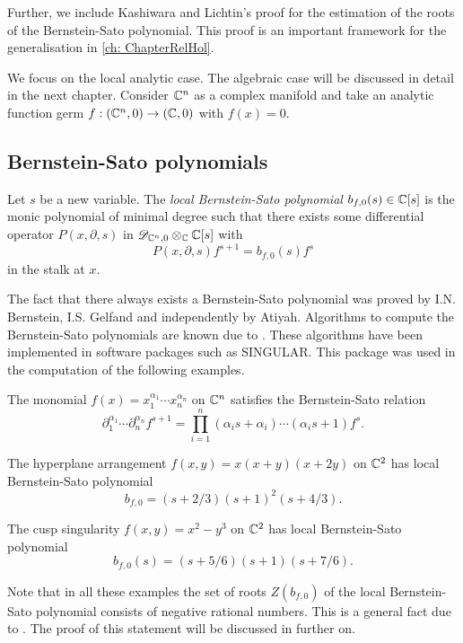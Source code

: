 Further, we include Kashiwara and Lichtin's proof for the estimation of the roots of the Bernstein-Sato polynomial.
This proof is an important framework for the generalisation in \cref{ch: ChapterRelHol}.

We focus on the local analytic case.
The algebraic case will be discussed in detail in the next chapter.
Consider $\mathbb{C}^n$ as a complex manifold and take an analytic function germ $f:(\mathbb{C}^n,0)\to (\mathbb{C},0)$ with  $f(x) = 0$.
\subsection{Bernstein-Sato polynomials}
\begin{definition}
  Let $s$ be a new variable.
  The {\it local Bernstein-Sato polynomial} $b_{f,0}(s)\in \mathbb{C}[s]$ is the monic polynomial of minimal degree such that there exists some differential operator $P(x,\partial,s)$ in $\mathscr{D}_{\mathbb{C}^n,0}\otimes_{\mathbb{C}}\mathbb{C}[s]$ with
  $$P(x,\partial,s) f^{s+1} = b_{f,0}(s) f^s$$
  in the stalk at $x$.
\end{definition}
The fact that there always exists a Bernstein-Sato polynomial was proved by I.N. Bernstein, I.S. Gelfand and independently by Atiyah.
Algorithms to compute the Bernstein-Sato polynomials are known due to \cite{oaku1997algorithm}.
These algorithms have been implemented in software packages such as SINGULAR.
This package was used in the computation of the following examples.
\begin{example}\label{ex: Monomial}
  The monomial $f(x) = x_1^{\alpha_1}\cdots x_n^{\alpha_n}$ on $\mathbb{C}^n$ satisfies the Bernstein-Sato relation
  $$\partial_1^{\alpha_1}\cdots \partial_n^{\alpha_n} f^{s+1} = \prod_{i=1}^n (\alpha_i s + \alpha_i)\cdots (\alpha_i s + 1) f^{s}. $$
\end{example}
\begin{example}
  The hyperplane arrangement $f(x,y) = x(x+y)(x+2y)$ on $\mathbb{C}^2$ has local Bernstein-Sato polynomial
  $$ b_{f,0} = (s+2/3)(s+1)^2(s+4/3).$$
\end{example}
\begin{example}\label{example: CuspBs}
  The cusp singularity $f(x,y) = x^2 - y^3$ on $\mathbb{C}^2$ has local Bernstein-Sato polynomial
  $$b_{f,0}(s) = (s+5/6)(s+1)(s+7/6).$$
\end{example}
Note that in all these examples the set of roots $Z(b_{f,0})$ of the local Bernstein-Sato polynomial consists of negative rational numbers.
This is a general fact due to \cite{kashiwara1976b}.
The proof of this statement will be discussed in further on.
